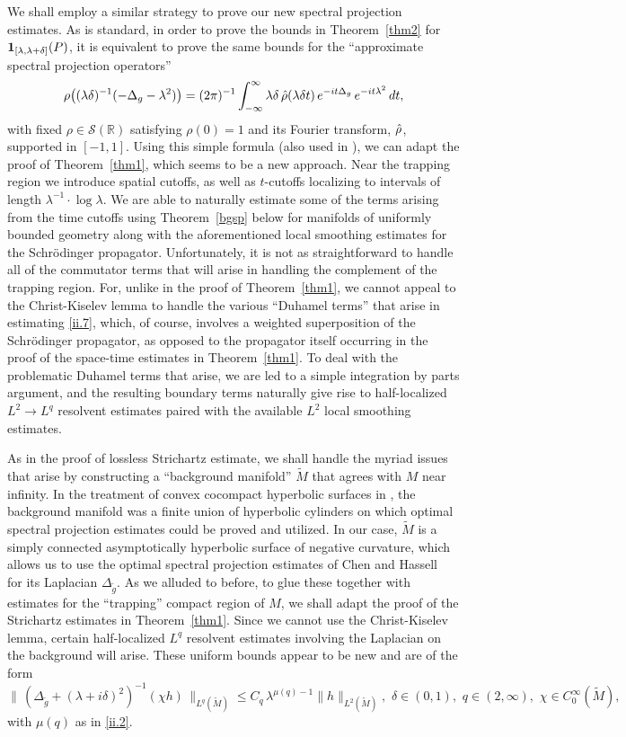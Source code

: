 \documentclass[10pt]{amsart}
\newcommand{\la}{\lambda}
\newcommand{\1}{{\bf 1}}
\newcommand{\R}{{\mathbb R}}
\begin{document}
We shall employ a similar strategy to prove our new spectral projection estimates.  As is standard,
in order to prove the bounds in Theorem~\ref{thm2} for $\1_{[\la,\la+\delta]}(P)$, it is equivalent to prove the
same bounds for the ``approximate spectral projection operators''
\begin{equation}\label{ii.7}
\rho\bigl((\la\delta)^{-1}(-\Delta_g-\la^2)\bigr)=(2\pi)^{-1} \int_{-\infty}^\infty
\la \delta \, \Hat \rho(\la\delta t) \, e^{-it\Delta_g} \, e^{-it\la^2} \, dt,
\end{equation}
with fixed $\rho\in {\mathcal S}(\R)$ satisfying $\rho(0)=1$ and its Fourier transform, $\Hat \rho$, supported in $[-1,1]$.
Using this simple formula (also used in \cite{AGL}), we can adapt the proof of Theorem~\ref{thm1}, which seems to be
a new approach.  Near the trapping region we introduce spatial cutoffs, as well as $t$-cutoffs localizing to intervals
of length $\la^{-1}\cdot \log\la$.  We are able to naturally estimate some of the terms arising from the time
cutoffs using Theorem~\ref{bgsp} below for manifolds of uniformly bounded geometry along with the aforementioned
local smoothing estimates for the Schr\"odinger propagator.  Unfortunately, it is not as straightforward to handle all of the
commutator terms that will arise in handling the complement of the trapping region.  For, unlike in the proof of 
Theorem~\ref{thm1}, we cannot appeal to the Christ-Kiselev lemma to handle the various ``Duhamel terms'' that
arise in estimating \eqref{ii.7}, which, of course, involves a weighted superposition of the Schr\"odinger propagator, as opposed
to the propagator itself occurring in the proof of the space-time estimates in Theorem~\ref{thm1}.  To deal with the
problematic Duhamel terms that arise, we are led to a simple integration by parts argument, and the resulting
boundary terms naturally give rise to half-localized $L^2\to L^q$ resolvent estimates paired with the available
$L^2$ local smoothing estimates.


As in the proof of lossless Strichartz estimate,
 we shall handle the myriad issues that arise by constructing a ``background manifold'' $\tilde M$ that agrees with
$M$ near infinity.  In the treatment of convex cocompact hyperbolic surfaces in \cite{AGL},  the background manifold was a finite
union of hyperbolic cylinders on which optimal spectral projection estimates could be proved and utilized.  In our case, $\tilde M$
is a simply connected asymptotically hyperbolic surface of negative curvature, which allows us to use the optimal spectral
projection estimates of Chen and Hassell~\cite{ChHa} for its Laplacian $\Delta_{\tilde g}$.  As we alluded to before, to glue these together
with estimates for the ``trapping'' compact region of $M$, we shall adapt the proof of the Strichartz estimates in Theorem~\ref{thm1}.
Since we cannot use the Christ-Kiselev lemma, certain half-localized $L^q$ resolvent estimates involving the Laplacian on the
background will arise.  These uniform bounds appear to be new and are of the form
$$\bigl\| \, (\Delta_{\tilde g}+(\lambda+i\delta)^2)^{-1}(\chi h)\, \bigr\|_{L^q(\tilde M)}\le C_q \, 
\la^{\mu(q)-1} \|h\|_{L^2(\tilde M)}, \, \,
\delta\in (0,1), \, \, q\in (2,\infty), \, \, \chi\in C^\infty_0(\tilde M),$$
with $\mu(q)$ as in \eqref{ii.2}.  
\end{document}
